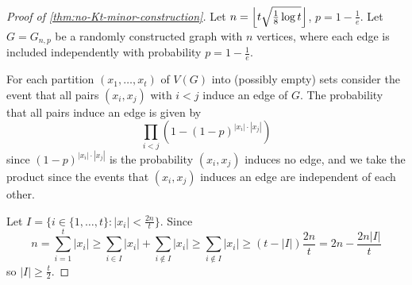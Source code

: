\documentclass[main.tex]{subfiles}
\begin{document}
\begin{proof}[Proof of \th\ref{thm:no-Kt-minor-construction}]
  Let $n = \left\lfloor t\sqrt{\frac 1 8\log t} \right\rfloor$, $p = 1 - \frac{1}{e}$.
  Let $G = G_{n,p}$ be a randomly constructed graph with $n$ vertices,
  where each edge is included independently with probability $p = 1 - \frac{1}{e}$.

  For each partition $(x_1,\ldots,x_t)$ of $V(G)$ into (possibly empty) sets
  consider the event that all pairs $(x_i, x_j)$ with $i < j$ induce an edge
  of $G$.
  The probability that all pairs induce an edge is given by
  \[
    \prod_{i<j}\left(1 - (1-p)^{|x_i|\cdot|x_j|}\right)
  \]
  since $(1-p)^{|x_i|\cdot|x_j|}$ is the probability $(x_i,x_j)$ induces no edge,
  and we take the product since the events that $(x_i,x_j)$ induces an edge
  are independent of each other.

  Let $I = \{i\in\{1,\ldots,t\} : |x_i| < \frac{2n}{t}\}$.
  Since
  \[
    n = \sum_{i=1}^t |x_i|\geq\sum_{i\in I}|x_i| + \sum_{i\notin I}|x_i|
    \geq\sum_{i\notin I}|x_i|\geq(t-|I|)\frac{2n}{t} = 2n - \frac{2n|I|}{t}
  \]
  so $|I|\geq\frac{t}{2}$.


\end{proof}
\end{document}
